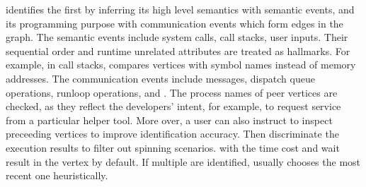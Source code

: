 \xxx identifies the \similarnodes first by inferring its high level semantics
with semantic events, and its programming purpose with communication events
which form edges in the graph. The semantic events include system calls, call
stacks, user inputs. Their sequential order and runtime unrelated attributes
are treated as hallmarks. For example, in call stacks, \xxx compares vertices
with symbol names instead of memory addresses. The communication events include
messages, dispatch queue operations, runloop operations, \dataflagread and
\dataflagwrite. The process names of peer vertices are checked, as they reflect
the developers' intent, for example, to request service from a particular
helper tool. More over, a user can also instruct \xxx to inspect preceeding
vertices to improve identification accuracy. Then \xxx discriminate the
execution results to filter out spinning scenarios.  with the time cost and
wait result in the vertex by default. If multiple \similarnodes are identified,
\xxx usually chooses the most recent one heuristically.
